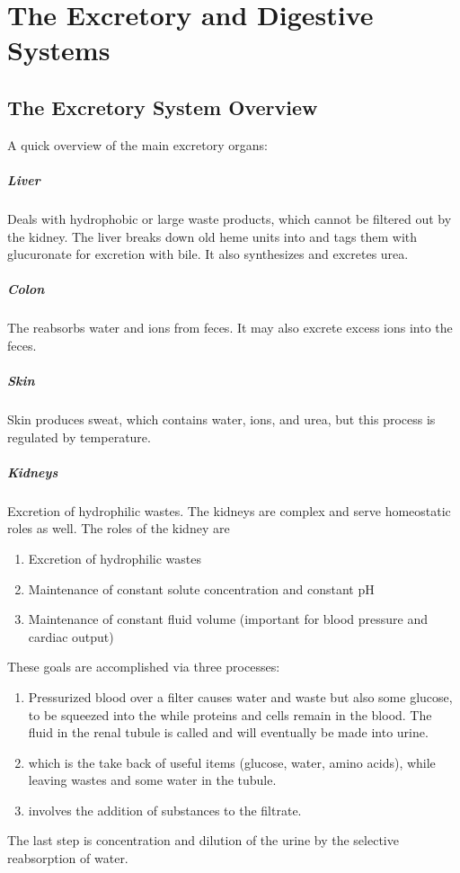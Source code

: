 \documentclass[../Bio_chemistryReview.tex]{subfiles}
\begin{document}
\chapter{The Excretory and Digestive Systems}
\section{The Excretory System Overview}
A quick overview of the main excretory organs:
\paragraph{Liver}
Deals with hydrophobic or large waste products, which cannot be filtered out by
the kidney. The liver breaks down old heme units into  and
tags them with glucuronate for excretion with bile. It also synthesizes and
excretes urea.

\paragraph{Colon}
The  reabsorbs water and ions from feces. It may also
excrete excess ions into the feces.

\paragraph{Skin}
Skin produces sweat, which contains water, ions, and urea, but this process is regulated by temperature.

\paragraph{Kidneys}
Excretion of hydrophilic wastes. The kidneys are complex and serve homeostatic
roles as well. The roles of the kidney are
\begin{enumerate}
  \item Excretion of hydrophilic wastes   
  \item Maintenance of constant solute concentration and constant pH
  \item Maintenance of constant fluid volume (important for blood pressure and
    cardiac output)
\end{enumerate}
These goals are accomplished via three processes:
\begin{enumerate}
  \item {} Pressurized blood over a filter causes water and
    waste but also some glucose, to be squeezed into the 
    while proteins and cells remain in the blood. The fluid in the renal tubule
    is called  and will eventually be made into urine.
  \item {} which is the take back of useful items
    (glucose, water, amino acids), while leaving wastes and some water in the
    tubule.
  \item {} involves the addition of substances to the filtrate.
\end{enumerate}
The last step is concentration and dilution of the urine by the selective
reabsorption of water.
\newpage
\end{document}
